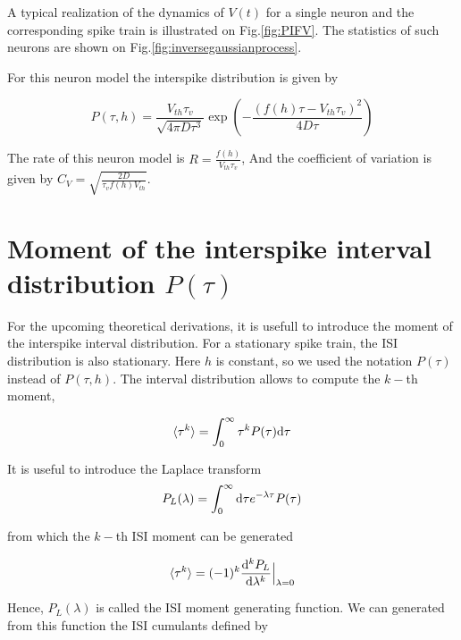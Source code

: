 \documentclass[12pt,twoside]{report}
\def \dd  {{\rm d}}
\begin{document}
A typical realization of the dynamics of $V(t)$ for a single neuron and the corresponding spike train is illustrated on Fig.\ref{fig:PIFV}. The statistics of such neurons are shown on Fig.\ref{fig:inversegaussianprocess}.



For this neuron model the interspike distribution is given by

\begin{equation}
\label{eq:inversegaussian}
P(\tau,h)=\frac{V_{th}\tau_v}{\sqrt{4\pi D\tau^3}}\exp\left(-\frac{(f(h)\tau-V_{th}\tau_v)^2}{4D\tau}\right)
\end{equation}

The rate of this neuron model is $R=\frac{f(h)}{V_{th}\tau_v}$, And the coefficient of variation is given by $C_V=\sqrt{\frac{2D}{\tau_vf(h)V_{th}}}$.



\section{Moment of the interspike interval distribution $P(\tau)$}

For the upcoming theoretical derivations, it is usefull to introduce the moment of the interspike interval distribution. For a stationary spike train, the ISI distribution is also stationary. Here  $h$ is constant, so we used the notation $P(\tau)$ instead of $P(\tau,h)$.  The interval distribution allows to compute the $k-$th moment,

\begin{equation}
\label{eq:Pmoment}
\langle\tau^k\rangle=\int_0^\infty \tau^kP(\tau)\dd\tau
\end{equation}

It is useful to introduce the Laplace transform
\begin{equation}
\label{eq:Plaplace}
P_L(\lambda)=\int_0^\infty\dd\tau e^{-\lambda \tau}P(\tau)
\end{equation}

from which the  $k-$th ISI moment can be generated

\begin{equation}
\label{eq:Pmoment2}
\langle\tau^k\rangle=(-1)^k\frac{\dd^k P_L}{\dd \lambda^k}\Bigr|_{\lambda=0}
\end{equation}

Hence, $P_L(\lambda)$ is called the ISI moment generating function. We can generated from this function the ISI cumulants defined by
\end{document}
